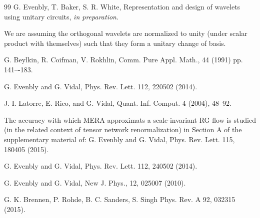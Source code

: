 \documentclass[aps,prl,twocolumn,showpacs,superscriptaddress,floatfix,10pt]{revtex4-1}
\begin{document}
\begin{thebibliography}{99}
G. Evenbly, T. Baker, S. R. White,
Representation and design of wavelets using unitary circuits, 
\emph{in preparation}.

We are assuming the orthogonal wavelets are normalized to unity (under scalar
product with themselves) such that they form a unitary change of basis.

G. Beylkin, R. Coifman, V. Rokhlin, 
Comm. Pure Appl. Math., 44 (1991) pp. 141–-183.


G. Evenbly and G. Vidal, 
Phys. Rev. Lett. 112, 220502 (2014).

J. I. Latorre, E. Rico, and G. Vidal, 
Quant. Inf. Comput. 4 (2004), 48--92.

%

The accuracy with which MERA approximats a scale-invariant RG flow is studied
(in the related context of tensor network renormalization) in Section A of the
supplementary material of: G. Evenbly and G. Vidal, Phys. Rev. Lett. 115,
180405 (2015). 

G. Evenbly and G. Vidal, 
Phys. Rev. Lett. 112, 240502 (2014).

G. Evenbly and G. Vidal, 
New J. Phys., 12, 025007 (2010).

G. K. Brennen, P. Rohde, B. C. Sanders, S. Singh
Phys. Rev. A 92, 032315 (2015). %


\end{thebibliography}
\end{document}
